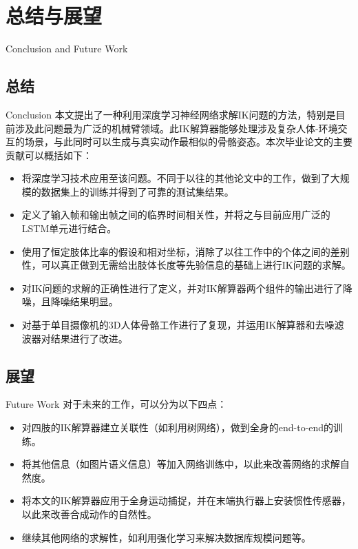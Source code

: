 \chapter{总结与展望}{Conclusion and Future Work}
\section{总结}{Conclusion}
本文提出了一种利用深度学习神经网络求解IK问题的方法，特别是目前涉及此问题最为广泛的机械臂领域。此IK解算器能够处理涉及复杂人体-环境交互的场景，与此同时可以生成与真实动作最相似的骨骼姿态。本次毕业论文的主要贡献可以概括如下：
\begin{itemize}
  \item 将深度学习技术应用至该问题。不同于以往的其他论文中的工作，做到了大规模的数据集上的训练并得到了可靠的测试集结果。
  \item 定义了输入帧和输出帧之间的临界时间相关性，并将之与目前应用广泛的LSTM单元进行结合。
  \item 使用了恒定肢体比率的假设和相对坐标，消除了以往工作中的个体之间的差别性，可以真正做到无需给出肢体长度等先验信息的基础上进行IK问题的求解。
  \item 对IK问题的求解的正确性进行了定义，并对IK解算器两个组件的输出进行了降噪，且降噪结果明显。
  \item 对基于单目摄像机的3D人体骨骼工作进行了复现，并运用IK解算器和去噪滤波器对结果进行了改进。
\end{itemize}
\section{展望}{Future Work}
对于未来的工作，可以分为以下四点：
\begin{itemize}
  \item 对四肢的IK解算器建立关联性（如利用树网络），做到全身的end-to-end的训练。
  \item 将其他信息（如图片语义信息）等加入网络训练中，以此来改善网络的求解自然度。
  \item 将本文的IK解算器应用于全身运动捕捉，并在末端执行器上安装惯性传感器，以此来改善合成动作的自然性。
  \item 继续其他网络的求解性，如利用强化学习来解决数据库规模问题等。
\end{itemize}
